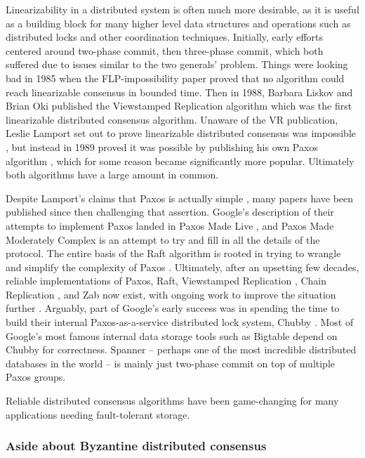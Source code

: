 \documentclass[a4paper,10pt]{article} \usepackage[utf8]{inputenc}
\begin{document}
Linearizability in a distributed system is often much more desirable, as it is
useful as a building block for many higher level data structures and operations
such as distributed locks and other coordination techniques. Initially, early
efforts centered around two-phase commit, then three-phase commit, which both
suffered due to issues similar to the two generals' problem. Things were looking
bad in 1985 when the FLP-impossibility paper \cite{flp} proved that no algorithm
could reach linearizable consensus in bounded time. Then in 1988, Barbara Liskov
and Brian Oki published the Viewstamped Replication algorithm \cite{vr} which
was the first linearizable distributed consensus algorithm. Unaware of the VR
publication, Leslie Lamport set out to prove linearizable distributed consensus
was impossible \cite{paxos-note}, but instead in 1989 proved it was possible by
publishing his own Paxos algorithm \cite{paxos}, which for some reason became
significantly more popular. Ultimately both algorithms have a large amount in
common.

Despite Lamport's claims that Paxos is actually simple \cite{paxos-simple},
many papers have been published since then
challenging that assertion. Google's description of their attempts to implement
Paxos landed in Paxos Made Live \cite{paxos-live}, and Paxos Made Moderately
Complex \cite{paxos-complex} is an attempt to try and fill in all the details of
the protocol. The entire basis of the Raft algorithm is rooted in trying to
wrangle and simplify the complexity of Paxos \cite{raft}. Ultimately, after an
upsetting few decades, reliable implementations of Paxos, Raft, Viewstamped
Replication \cite{vrr}, Chain Replication \cite{chain-rep}, and Zab \cite{zab}
now exist, with ongoing work to improve the situation
further \cite{epaxos,paxos-flexible}. Arguably, part of Google's early success
was in spending the time to build their internal Paxos-as-a-service distributed
lock system, Chubby \cite{chubby}. Most of Google's most famous internal data
storage tools such as Bigtable \cite{bigtable} depend on Chubby for
correctness. Spanner \cite{spanner} -- perhaps one of the most incredible
distributed databases in the world -- is mainly just two-phase commit on top of
multiple Paxos groups.

Reliable distributed consensus algorithms have been game-changing for many
applications needing fault-tolerant storage.

\subsubsection{Aside about Byzantine distributed consensus}
\end{document}
